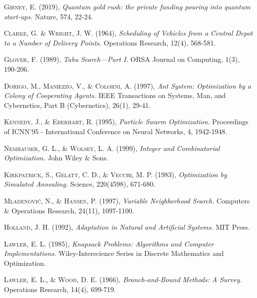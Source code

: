 \documentclass[11pt,a4paper,spanish]{book}
\begin{document}
\begin{thebibliography}{a}
	 \textsc{Gibney, E.} (2019),
	\textit{Quantum gold rush: the private funding pouring into quantum start-ups.}
	Nature, 574, 22-24.

	 \textsc{Clarke, G. \& Wright, J. W.} (1964),
	\textit{Scheduling of Vehicles from a Central Depot to a Number of Delivery Points.}
	Operations Research, 12(4), 568-581.
	
	 \textsc{Glover, F.} (1989),
	\textit{Tabu Search—Part I.}
	ORSA Journal on Computing, 1(3), 190-206.
	
	 \textsc{Dorigo, M., Maniezzo, V., \& Colorni, A.} (1997),
	\textit{Ant System: Optimization by a Colony of Cooperating Agents.}
	IEEE Transactions on Systems, Man, and Cybernetics, Part B (Cybernetics), 26(1), 29-41.
	
	 \textsc{Kennedy, J., \& Eberhart, R.} (1995),
	\textit{Particle Swarm Optimization.}
	Proceedings of ICNN'95 - International Conference on Neural Networks, 4, 1942-1948.
	
	 \textsc{Nemhauser, G. L., \& Wolsey, L. A.} (1999),
	\textit{Integer and Combinatorial Optimization.} John Wiley \& Sons.
	
	 \textsc{Kirkpatrick, S., Gelatt, C. D., \& Vecchi, M. P.} (1983),
	\textit{Optimization by Simulated Annealing.}
	Science, 220(4598), 671-680.
	
	 \textsc{Mladenović, N., \& Hansen, P.} (1997),
	\textit{Variable Neighborhood Search.}
	Computers \& Operations Research, 24(11), 1097-1100.
	
	 \textsc{Holland, J. H.} (1992),
	\textit{Adaptation in Natural and Artificial Systems.}
	MIT Press.
	
	 \textsc{Lawler, E. L.} (1985),
	\textit{Knapsack Problems: Algorithms and Computer Implementations.}
	Wiley-Interscience Series in Discrete Mathematics and Optimization.
	
	 \textsc{Lawler, E. L., \& Wood, D. E.} (1966),
	\textit{Branch-and-Bound Methods: A Survey.}
	Operations Research, 14(4), 699-719.
	

\end{thebibliography}
\end{document}
